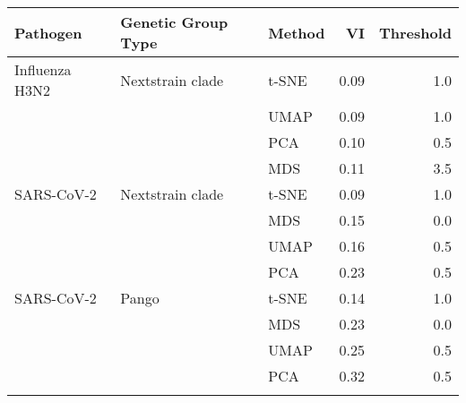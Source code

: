 \begin{tabular}{lllrr}
\toprule
      Pathogen & Genetic Group Type & Method &   VI &  Threshold \\
\midrule
Influenza H3N2 &   Nextstrain clade &  t-SNE & 0.09 &        1.0 \\
               &                    &   UMAP & 0.09 &        1.0 \\
               &                    &    PCA & 0.10 &        0.5 \\
               &                    &    MDS & 0.11 &        3.5 \\
    SARS-CoV-2 &   Nextstrain clade &  t-SNE & 0.09 &        1.0 \\
               &                    &    MDS & 0.15 &        0.0 \\
               &                    &   UMAP & 0.16 &        0.5 \\
               &                    &    PCA & 0.23 &        0.5 \\
    SARS-CoV-2 &              Pango &  t-SNE & 0.14 &        1.0 \\
               &                    &    MDS & 0.23 &        0.0 \\
               &                    &   UMAP & 0.25 &        0.5 \\
               &                    &    PCA & 0.32 &        0.5 \\
\botrule
\end{tabular}
